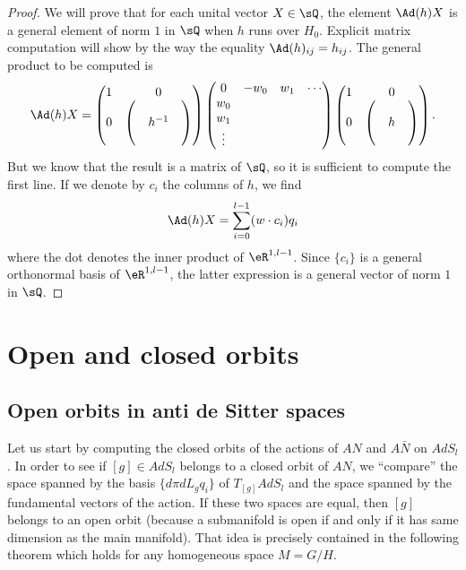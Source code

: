 \begin{proof}
We will prove that for each unital vector $X\in\sQ$, the element $\Ad(h)X$ is a general element of norm $1$ in $\sQ$ when $h$ runs over $H_0$. Explicit matrix computation will show by the way the equality  $\Ad(h)_{ij}=h_{ij}$. The general product to be computed is
\[ 
\Ad(h)X=
  \begin{pmatrix}
1	&	0\\
0	&
\begin{pmatrix}
&&\\
&h^{-1}\\
&&
\end{pmatrix}
\end{pmatrix}
\begin{pmatrix}
0&-w_0&w_1&\cdots\\
w_0\\
w_1\\
\vdots
\end{pmatrix}
  \begin{pmatrix}
1	&	0\\
0	&
\begin{pmatrix}
&&\\
&h\\
&&
\end{pmatrix}
\end{pmatrix}.
\]
But we know that the result is a matrix of $\sQ$, so it is sufficient to compute the first line. If we denote by $c_i$ the columns of $h$, we find
\[ 
  \Ad(h)X=\sum_{i=0}^{l-1}(w\cdot c_i)q_i
\]
where the dot denotes the inner product of $\eR^{1,l-1}$. Since $\{ c_i \}$ is a general orthonormal basis of $\eR^{1,l-1}$, the latter expression is a general vector of norm $1$ in $\sQ$.
\end{proof}

\section{Open and closed orbits}

\subsection{Open orbits in anti de Sitter spaces}

Let us start by computing the closed orbits of the actions of $AN$ and $A\bar{N}$ on $AdS_l$. In order to see if $[g]\in AdS_l$ belongs to a closed orbit of $AN$, we ``compare'' the space spanned by the basis $\{d\pi dL_g q_i\}$ of $T_{[g]}AdS_l$ and the space spanned by the fundamental vectors of the action. If these two spaces are equal, then $[g]$ belongs to an open orbit (because a submanifold is open if and only if it has same dimension as the main manifold). That idea is precisely contained in the following theorem which holds for any homogeneous space $M=G/H$.

